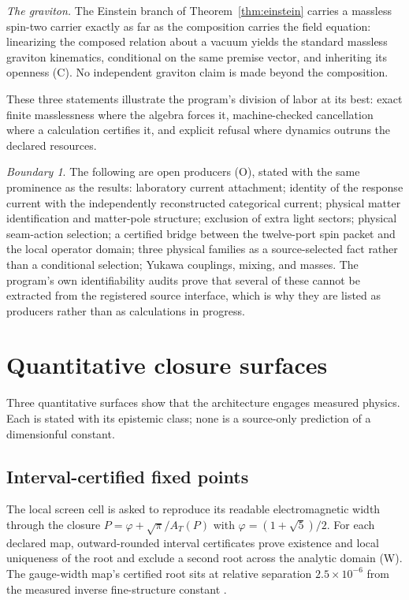\documentclass[11pt]{article}
\theoremstyle{remark}
\newtheorem{boundary}[theorem]{Boundary}
\newcommand{\evW}{\textsf{W}}   %
\newcommand{\evC}{\textsf{C}}   %
\newcommand{\evO}{\textsf{O}}   %
\begin{document}
\emph{The graviton.} The Einstein branch of Theorem~\ref{thm:einstein}
carries a massless spin-two carrier exactly as far as the composition
carries the field equation: linearizing the composed relation about a
vacuum yields the standard massless graviton kinematics, conditional on the
same premise vector, and inheriting its openness (\evC). No independent
graviton claim is made beyond the composition.

These three statements illustrate the program's division of labor at its
best: exact finite masslessness where the algebra forces it, machine-checked
cancellation where a calculation certifies it, and explicit refusal where
dynamics outruns the declared resources.

\begin{boundary}
The following are open producers (\evO), stated with the same prominence as
the results: laboratory current attachment; identity of the response current
with the independently reconstructed categorical current; physical matter
identification and matter-pole structure; exclusion of extra light sectors;
physical seam-action selection; a certified bridge between the twelve-port
spin packet and the local operator domain; three physical families as a
source-selected fact rather than a conditional selection; Yukawa couplings,
mixing, and masses. The program's own identifiability audits prove that
several of these cannot be extracted from the registered source
interface, which is why they are listed as producers rather than as
calculations in progress.
\end{boundary}

\section{Quantitative closure surfaces}
\label{sec:quantitative}

Three quantitative surfaces show that the architecture engages measured
physics. Each is stated with its epistemic class; none is a source-only
prediction of a dimensionful constant.

\subsection{Interval-certified fixed points}

The local screen cell is asked to reproduce its readable electromagnetic
width through the closure $P=\varphi+\sqrt\pi/A_T(P)$ with
$\varphi=(1+\sqrt5)/2$. For each declared map, outward-rounded interval
certificates prove existence and local uniqueness of the root and exclude a
second root across the analytic domain (\evW). The gauge-width map's
certified root sits at relative separation $2.5\times10^{-6}$ from the
measured inverse fine-structure constant \cite{codata2022}.
\end{document}
